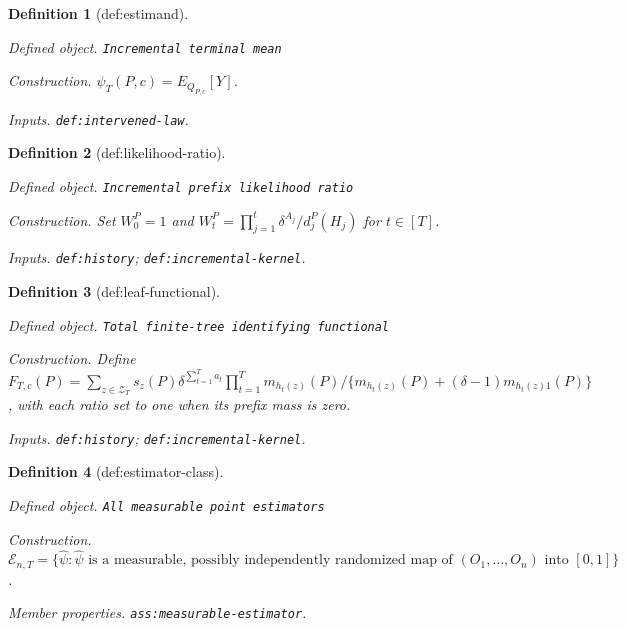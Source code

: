 \documentclass{article}
\newtheorem{definition}{Definition}
\begin{document}
\begin{definition}[def:estimand]\label{def:estimand}
\par\smallskip\noindent\emph{Defined object.} \texttt{Incremental terminal mean}
\par\smallskip\noindent\emph{Construction.} \(\psi_T(P,c)=E_{Q_{P,c}}[Y]\).
\par\smallskip\noindent\emph{Inputs.} \texttt{def:\allowbreak{}intervened-\allowbreak{}law}.
\end{definition}

\begin{definition}[def:likelihood-ratio]\label{def:likelihood-ratio}
\par\smallskip\noindent\emph{Defined object.} \texttt{Incremental prefix likelihood ratio}
\par\smallskip\noindent\emph{Construction.} Set \(W_0^P=1\) and \(W_t^P=\prod_{j=1}^t\delta^{A_j}/d_j^P(H_j)\) for \(t\in[T]\).
\par\smallskip\noindent\emph{Inputs.} \texttt{def:\allowbreak{}history}; \texttt{def:\allowbreak{}incremental-\allowbreak{}kernel}.
\end{definition}

\begin{definition}[def:leaf-functional]\label{def:leaf-functional}
\par\smallskip\noindent\emph{Defined object.} \texttt{Total finite-\allowbreak{}tree identifying functional}
\par\smallskip\noindent\emph{Construction.} Define \(F_{T,c}(P)=\sum_{z\in\mathcal Z_T}s_z(P)\delta^{\sum_{t=1}^T a_t}\prod_{t=1}^T m_{h_t(z)}(P)/\{m_{h_t(z)}(P)+(\delta-1)m_{h_t(z)1}(P)\}\), with each ratio set to one when its prefix mass is zero.
\par\smallskip\noindent\emph{Inputs.} \texttt{def:\allowbreak{}history}; \texttt{def:\allowbreak{}incremental-\allowbreak{}kernel}.
\end{definition}

\begin{definition}[def:estimator-class]\label{def:estimator-class}
\par\smallskip\noindent\emph{Defined object.} \texttt{All measurable point estimators}
\par\smallskip\noindent\emph{Construction.} \(\mathcal E_{n,T}=\{\widehat\psi:\widehat\psi\text{ is a measurable, possibly independently randomized map of }(O_1,\ldots,O_n)\text{ into }[0,1]\}\).
\par\smallskip\noindent\emph{Member properties.} \texttt{ass:\allowbreak{}measurable-\allowbreak{}estimator}.
\end{definition}
\end{document}
